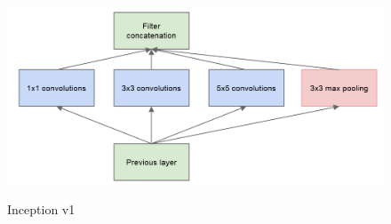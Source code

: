 \begin{figure}[h]
  \centering
  \includegraphics[width=13cm, height=6cm]{Img/Inception.jpg}
  \caption{Inception v1\cite{szegedy2015going}}
  \label{fig:inception-v1}
\end{figure}
